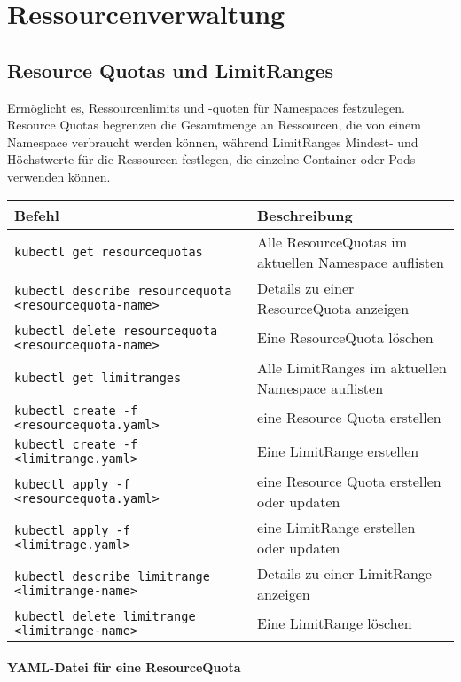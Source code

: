 \chapter{Ressourcenverwaltung}

\section{Resource Quotas und LimitRanges}
Ermöglicht es, Ressourcenlimits und -quoten für Namespaces festzulegen. Resource Quotas begrenzen die Gesamtmenge an Ressourcen, die von einem Namespace verbraucht werden können, während LimitRanges Mindest- und Höchstwerte für die Ressourcen festlegen, die einzelne Container oder Pods verwenden können.\\

\noindent
\begin{tabular}{
|p{}|p{}|}
\hline
\textbf{Befehl} & \textbf{Beschreibung} \\
\hline
\texttt{kubectl get resourcequotas} & Alle ResourceQuotas im aktuellen Namespace auflisten \\
\texttt{kubectl describe resourcequota <resourcequota-name>} & Details zu einer ResourceQuota anzeigen \\
\texttt{kubectl delete resourcequota <resourcequota-name>} & Eine ResourceQuota löschen \\
\texttt{kubectl get limitranges} & Alle LimitRanges im aktuellen Namespace auflisten \\
\texttt{kubectl create -f <resourcequota.yaml>} & eine Resource Quota erstellen\\
\texttt{kubectl create -f <limitrange.yaml>} & Eine LimitRange erstellen\\
\texttt{kubectl apply -f <resourcequota.yaml>} & eine Resource Quota erstellen oder updaten\\
\texttt{kubectl apply -f <limitrage.yaml>} & eine LimitRange erstellen oder updaten\\
\texttt{kubectl describe limitrange <limitrange-name>} & Details zu einer LimitRange anzeigen \\
\texttt{kubectl delete limitrange <limitrange-name>} & Eine LimitRange löschen \\
\hline
\end{tabular}

\subsubsection{YAML-Datei für eine ResourceQuota}


